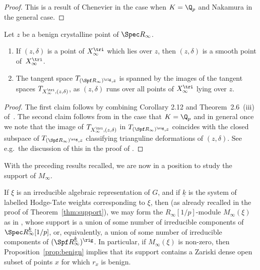 \begin{proof}
This is a result
of Chenevier \cite[Lem.\,4.4]{Chenevier} in the case when $K = \Q_p$
and Nakamura \cite[Lem.\,4.2]{Nakamura} in the general case.
\end{proof}

\begin{thm}
\label{thm:infinite fern}
Let $z$ be a benign crystalline point of $\Spec R_{\infty}$.
\begin{enumerate}
\item
If $(z,\delta)$ is a point of $X^{\tri}_{\infty}$ which
lies over $z$, then $(z,\delta)$ is a smooth point
of~$X^{\tri}_{\infty}$.
\item The tangent space
$T_{(\Spf R_{\infty})^{\rig}, z}$ is spanned by the
images of the tangent spaces $T_{X^{\tri}_{\infty}, (z,\delta)}$,
as $(z,\delta)$ runs over
all points of $X^{\tri}_{\infty}$ lying over $z$.
\end{enumerate}
\end{thm}

\begin{proof}
The first claim follows by combining
Corollary 2.12 and Theorem~2.6~(iii)
of~\cite{BHS}.
The second claim follows from \cite{Chenevier} in the case that $K
= \Q_p$ and \cite[Th.\,2.62]{Nakamura2} in general once we note that the image
of
$T_{X^{\tri}_{\infty}, (z,\delta)}$
in $T_{(\Spf R_{\infty})^{\rig}, z}$ coincides with the closed subspace of
$T_{(\Spf R_{\infty})^{\rig}, z}$
classifying trianguline deformations of $(z,\delta)$. See e.g.\
the discussion of this in the proof of \cite[Th.\,2.6]{BHS}.
\end{proof}

With the preceding results recalled,
we are now in a position to study the support of $M_{\infty}$.

If $\xi$ is an irreducible algebraic representation of $G$,
and if $\underline{k}$ is the system of labelled
Hodge-Tate weights corresponding to $\xi$,
then (as already recalled in the proof of Theorem~\ref{thm:support}),
we may form the $R_{\infty}[1/p]$-module $M_{\infty}(\xi)$
as in \cite{six-authors}, whose support is a union of some
number of irreducible components of $\Spec R_{\infty}^{\underline{k}}
[1/p]$, or, equivalently,
a union of some number of irreducible components of
$(\Spf R_{\infty}^{\underline{k}})^{\rig}$.
In particular, if $M_{\infty}(\xi)$ is non-zero,
then Proposition~\ref{prop:benign} implies that its support contains a
Zariski dense open subset of points $x$ for which $r_x$ is benign.

